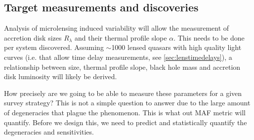 
\subsection{Target measurements and discoveries}
\label{sec:\secname:targets}



Analysis of microlensing induced variability will allow the measurement of 
accretion disk sizes $R_\lambda$ and their thermal profile slope $\alpha$. This 
needs to be done per system discovered. Assuming $\sim$1000 lensed quasars with 
high quality light curves (i.e. that allow time delay measurements, see 
\autoref{sec:lenstimedelays}), a relationship between size, thermal profile 
slope, black hole mass and accretion disk luminosity will likely be derived.

How precisely are we going to be able to measure these parameters for a given 
survey strategy? This is not a simple question to answer due to the large 
amount of degeneracies that plague the phenomenon. This is what out MAF metric 
will quantify. Before we design this, we need to predict and statistically 
quantify the degeneracies and sensitivities.




